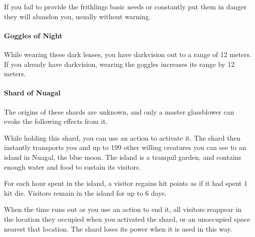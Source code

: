         If you fail to provide the frithlings basic needs or constantly put them in danger they will abandon you, usually without warning.
    \paragraph{Goggles of Night}
        While wearing these dark lenses, you have darkvision out to a range of 12 meters.
        If you already have darkvision, wearing the goggles increases its range by 12 meters.
    \paragraph{Shard of Nuagal}
        The origins of these shards are unknown, and only a master glassblower can evoke the following effects from it.

        While holding this shard, you can use an action to activate it.
        The shard then instantly transports you and up to 199 other willing creatures you can see to an island in Nuagal, the blue moon.
        The island is a tranquil garden, and contains enough water and food to sustain its visitors.

        For each hour spent in the island, a visitor regains hit points as if it had spent 1 hit die.
        Visitors remain in the island for up to 6 days.

        When the time runs out or you use an action to end it, all visitors reappear in the location they occupied when you activated the shard, or an unoccupied space nearest that location.
        The shard loses its power when it is used in this way.
